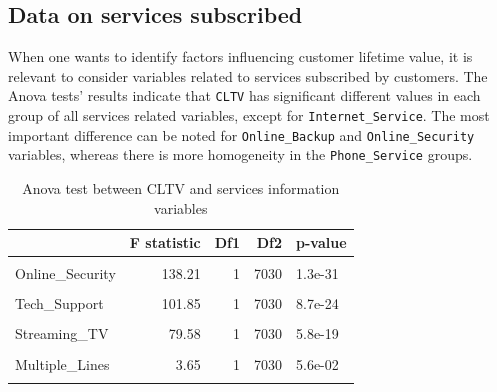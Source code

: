 \documentclass[
]{book}
\begin{document}
\hypertarget{data-on-services-subscribed-1}{%
\subsection*{Data on services subscribed}\label{data-on-services-subscribed-1}}

When one wants to identify factors influencing customer lifetime value, it is relevant to consider variables related to services subscribed by customers. The Anova tests' results indicate that \texttt{CLTV} has significant different values in each group of all services related variables, except for \texttt{Internet\_Service}. The most important difference can be noted for \texttt{Online\_Backup} and \texttt{Online\_Security} variables, whereas there is more homogeneity in the \texttt{Phone\_Service} groups.

\begin{table}[H]

\caption{\label{tab:aovservices}Anova test between CLTV and services information variables}
\centering
\begin{tabular}[t]{lrrrl}
\toprule
  & F statistic & Df1 & Df2 & p-value\\
\midrule
\cellcolor{gray!6}{Online\_Backup} & \cellcolor{gray!6}{138.57} & \cellcolor{gray!6}{1} & \cellcolor{gray!6}{7030} & \cellcolor{gray!6}{1.1e-31}\\
Online\_Security & 138.21 & 1 & 7030 & 1.3e-31\\
\cellcolor{gray!6}{Device\_Protection} & \cellcolor{gray!6}{105.23} & \cellcolor{gray!6}{1} & \cellcolor{gray!6}{7030} & \cellcolor{gray!6}{1.6e-24}\\
Tech\_Support & 101.85 & 1 & 7030 & 8.7e-24\\
\cellcolor{gray!6}{Streaming\_Movies} & \cellcolor{gray!6}{90.96} & \cellcolor{gray!6}{1} & \cellcolor{gray!6}{7030} & \cellcolor{gray!6}{2e-21}\\
\addlinespace
Streaming\_TV & 79.58 & 1 & 7030 & 5.8e-19\\
\cellcolor{gray!6}{Phone\_Service} & \cellcolor{gray!6}{3.65} & \cellcolor{gray!6}{1} & \cellcolor{gray!6}{7030} & \cellcolor{gray!6}{5.6e-02}\\
Multiple\_Lines & 3.65 & 1 & 7030 & 5.6e-02\\
\cellcolor{gray!6}{Internet\_Service} & \cellcolor{gray!6}{0.56} & \cellcolor{gray!6}{2} & \cellcolor{gray!6}{7029} & \cellcolor{gray!6}{5.7e-01}\\
\bottomrule
\end{tabular}
\end{table}
\end{document}
